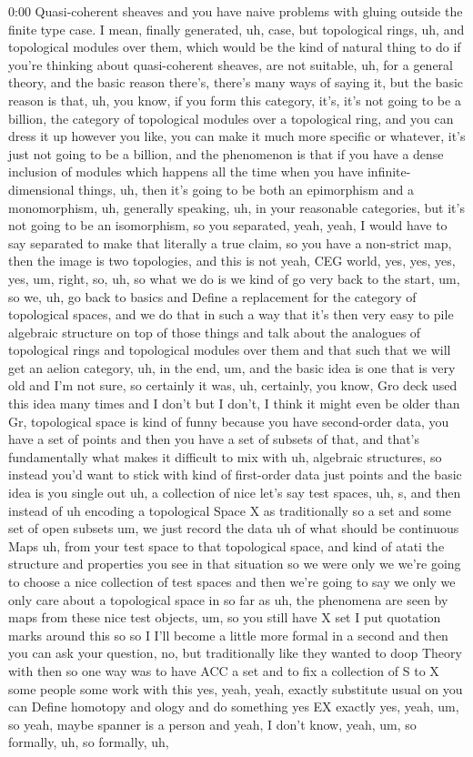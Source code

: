 \begin{unfinished}{0:00}
Quasi-coherent sheaves and you have naive problems with gluing outside the finite type case. I mean, finally generated, uh, case, but topological rings, uh, and topological modules over them, which would be the kind of natural thing to do if you're thinking about quasi-coherent sheaves, are not suitable, uh, for a general theory, and the basic reason there's, there's many ways of saying it, but the basic reason is that, uh, you know, if you form this category, it's, it's not going to be a billion, the category of topological modules over a topological ring, and you can dress it up however you like, you can make it much more specific or whatever, it's just not going to be a billion, and the phenomenon is that if you have a dense inclusion of modules which happens all the time when you have infinite-dimensional things, uh, then it's going to be both an epimorphism and a monomorphism, uh, generally speaking, uh, in your reasonable categories, but it's not going to be an isomorphism, so you separated, yeah, yeah, I would have to say separated to make that literally a true claim, so you have a non-strict map, then the image is two topologies, and this is not yeah, CEG world, yes, yes, yes, yes, um, right, so, uh, so what we do is we kind of go very back to the start, um, so we, uh, go back to basics and Define a replacement for the category of topological spaces, and we do that in such a way that it's then very easy to pile algebraic structure on top of those things and talk about the analogues of topological rings and topological modules over them and that such that we will get an aelion category, uh, in the end, um, and the basic idea is one that is very old and I'm not sure, so certainly it was, uh, certainly, you know, Gro deck used this idea many times and I don't but I don't, I think it might even be older than Gr, topological space is kind of funny because you have second-order data, you have a set of points and then you have a set of subsets of that, and that's fundamentally what makes it difficult to mix with uh, algebraic structures, so instead you'd want to stick with kind of first-order data just points and the basic idea is you single out uh, a collection of nice let's say test spaces, uh, s, and then instead of uh encoding a topological Space X as traditionally so a set and some set of open subsets um, we just record the data uh of what should be continuous Maps uh, from your test space to that topological space, and kind of atati the structure and properties you see in that situation so we were only we we're going to choose a nice collection of test spaces and then we're going to say we only we only care about a topological space in so far as uh, the phenomena are seen by maps from these nice test objects, um, so you still have X set I put quotation marks around this so so I I'll become a little more formal in a second and then you can ask your question, no, but traditionally like they wanted to doop Theory with then so one way was to have ACC a set and to fix a collection of S to X some people some work with this yes, yeah, yeah, exactly substitute usual on you can Define homotopy and ology and do something yes EX exactly yes, yeah, um, so yeah, maybe spanner is a person and yeah, I don't know, yeah, um, so formally, uh, so formally, uh, 
\end{unfinished}
